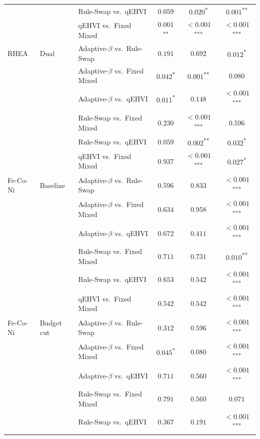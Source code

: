\begin{tabular}{lllccc}
 &  & Rule-Swap vs.\ qEHVI & $0.059$ & $0.020$\textsuperscript{*} & $0.001$\textsuperscript{**} \\
 &  & qEHVI vs.\ Fixed Mixed & $0.001$\textsuperscript{**} & $<0.001$\textsuperscript{***} & $<0.001$\textsuperscript{***} \\
\midrule
RHEA & Dual & Adaptive-$\beta$ vs.\ Rule-Swap & $0.191$ & $0.692$ & $0.012$\textsuperscript{*} \\
 &  & Adaptive-$\beta$ vs.\ Fixed Mixed & $0.042$\textsuperscript{*} & $0.001$\textsuperscript{**} & $0.080$ \\
 &  & Adaptive-$\beta$ vs.\ qEHVI & $0.011$\textsuperscript{*} & $0.148$ & $<0.001$\textsuperscript{***} \\
 &  & Rule-Swap vs.\ Fixed Mixed & $0.230$ & $<0.001$\textsuperscript{***} & $0.596$ \\
 &  & Rule-Swap vs.\ qEHVI & $0.059$ & $0.002$\textsuperscript{**} & $0.032$\textsuperscript{*} \\
 &  & qEHVI vs.\ Fixed Mixed & $0.937$ & $<0.001$\textsuperscript{***} & $0.027$\textsuperscript{*} \\
\midrule
Fe-Co-Ni & Baseline & Adaptive-$\beta$ vs.\ Rule-Swap & $0.596$ & $0.833$ & $<0.001$\textsuperscript{***} \\
 &  & Adaptive-$\beta$ vs.\ Fixed Mixed & $0.634$ & $0.958$ & $<0.001$\textsuperscript{***} \\
 &  & Adaptive-$\beta$ vs.\ qEHVI & $0.672$ & $0.411$ & $<0.001$\textsuperscript{***} \\
 &  & Rule-Swap vs.\ Fixed Mixed & $0.711$ & $0.731$ & $0.010$\textsuperscript{**} \\
 &  & Rule-Swap vs.\ qEHVI & $0.653$ & $0.542$ & $<0.001$\textsuperscript{***} \\
 &  & qEHVI vs.\ Fixed Mixed & $0.542$ & $0.542$ & $<0.001$\textsuperscript{***} \\
\midrule
Fe-Co-Ni & Budget cut & Adaptive-$\beta$ vs.\ Rule-Swap & $0.312$ & $0.596$ & $<0.001$\textsuperscript{***} \\
 &  & Adaptive-$\beta$ vs.\ Fixed Mixed & $0.045$\textsuperscript{*} & $0.080$ & $<0.001$\textsuperscript{***} \\
 &  & Adaptive-$\beta$ vs.\ qEHVI & $0.711$ & $0.560$ & $<0.001$\textsuperscript{***} \\
 &  & Rule-Swap vs.\ Fixed Mixed & $0.791$ & $0.560$ & $0.071$ \\
 &  & Rule-Swap vs.\ qEHVI & $0.367$ & $0.191$ & $<0.001$\textsuperscript{***} \\

\end{tabular}
